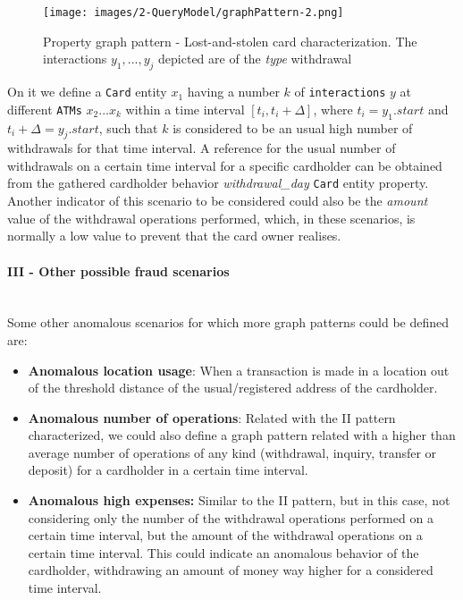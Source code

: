 \begin{figure}[H]
  \centering
  \texttt{[image: images/2-QueryModel/graphPattern-2.png]}
  \caption{Property graph pattern - Lost-and-stolen card characterization. The interactions $y_1,...,y_j$ depicted are of the \emph{type} withdrawal}
  \label{img:graphPattern-2}
\end{figure}

On it we define a \texttt{Card} entity $x_1$ having a number $k$ of \texttt{interactions} $y$ at different \texttt{ATMs} $x_2 ... x_k$ within a time interval $[t_i, t_i + \Delta]$, where $t_i = y_1.\textit{start}$ and $t_i + \Delta = y_j.\textit{start}$, such that $k$ is considered to be an usual high number of withdrawals for that time interval. A reference for the usual number of withdrawals on a certain time interval for a specific cardholder can be obtained from the gathered cardholder behavior \emph{withdrawal\_day} \texttt{Card} entity property.
Another indicator of this scenario to be considered could also be the \emph{amount} value of the withdrawal operations performed, which, in these scenarios, is normally a low value to prevent that the card owner realises.

\paragraph{III - Other possible fraud scenarios\\\\}

Some other anomalous scenarios for which more graph patterns could be defined are:
\begin{itemize}
    \item \textbf{Anomalous location usage}: When a transaction is made in a location out of the threshold distance of the usual/registered address of the cardholder.
    \item \textbf{Anomalous number of operations}: Related with the II pattern characterized, we could also define a graph pattern related with a higher than average number of operations of any kind (withdrawal, inquiry, transfer or deposit) for a cardholder in a certain time interval.
    \item \textbf{Anomalous high expenses:} Similar to the II pattern, but in this case, not considering only the number of the withdrawal operations performed on a certain time interval, but the amount of the withdrawal operations on a certain time interval. This could indicate an anomalous behavior of the cardholder, withdrawing an amount of money way higher for a considered time interval.
\end{itemize}
\fi

